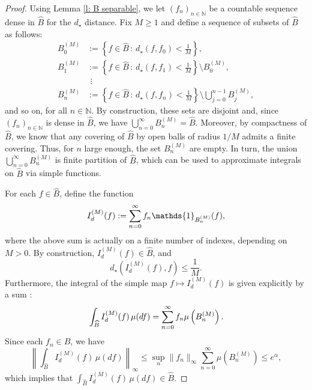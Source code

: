 \documentclass[a4paper, 11pt]{article}
\theoremstyle{definition}
\newcommand{\indi}[1]{\mathds{1}_{#1}}
\begin{document}
{\begin{proof}
Using Lemma \ref{l: B separable}, we let \( (f_n)_{n \in \mathbb{N}} \) be a countable sequence dense in \( \widehat{B} \) for the $d_\star$ distance. Fix \( M \geq 1 \) and define a sequence of subsets of \( \widehat{B} \) as follows:
\[
\begin{aligned}
B_0^{(M)} & := \left\{ f \in \widehat{B} \,:\, d_\star(f, f_0) < \frac{1}{M} \right\}, \\
B_1^{(M)} & := \left\{ f \in \widehat{B} \,:\, d_\star(f, f_1) < \frac{1}{M} \right\} \setminus B_0^{(M)}, \\
& \ \, \vdots \\
B_n^{(M)} & := \left\{ f \in \widehat{B} \,:\, d_\star(f, f_n) < \frac{1}{M} \right\} \setminus \bigcup_{j=0}^{n-1} B_j^{(M)},
\end{aligned}
\]
and so on, for all \( n \in \mathbb{N} \). By construction, these sets are disjoint and, since \( (f_n)_{n \in \mathbb{N}} \) is dense in \( \widehat{B} \), we have \( \bigcup_{n=0}^\infty B_n^{(M)} = \widehat{B} \). 
Moreover, by compactness of $\widehat{B}$, we know that any covering of $\widehat{B}$ by open balls of radius $1/M$ admits a finite covering. Thus, for $n$ large enough, the set $B^{(M)}_n$ are empty. In turn,
the union $\bigcup_{n=0}^\infty B_n^{(M)}$ is finite partition of \( \widehat{B} \), which can be used to approximate integrals on \( \widehat{B} \) via simple functions. 

For each \( f \in \widehat{B} \), define the function
\begin{equation}{\label{eq: Id f}}
I_d^{(M)}(f) := \sum_{n = 0}^\infty f_n \indi{B_n^{(M)}}(f),
\end{equation}
where the above sum is actually on a finite number of indexes, depending on $M>0$.
By construction, \( I_d^{(M)}(f) \in \widehat{B} \), and
\[
d_\star\left( I_d^{(M)}(f), f \right) \le \frac{1}{M}.
\]
Furthermore, the integral of the simple map \(  f \mapsto I_d^{(M)}(f) \) is 
given explicitly by a sum :
\begin{equation}{\label{eq: int Id f}}
\int_{\widehat{B}} I_d^{(M)}(f) \, \mu(df) = \sum_{n = 0}^\infty f_n \mu\left(B_n^{(M)}\right).
\end{equation}
Since each \( f_n \in \widehat{B} \), we have
\[
\left\| \int_{\widehat{B}} I_d^{(M)}(f) \, \mu(df) \right\|_\infty \le \sup_n \|f_n\|_\infty \sum_{n = 0}^\infty \mu(B_n^{(M)}) \le e^\alpha,
\]
which implies that \( \int_{\widehat{B}} I_d^{(M)}(f) \, \mu(df) \in \widehat{B} \).


\end{proof}}
\end{document}
